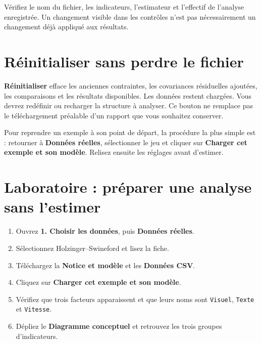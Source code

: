 \documentclass[
  french,
  11pt,
  a4paper,
  DIV=11,
  numbers=noendperiod]{scrreprt}
\providecommand{\tightlist}{%
  \setlength{\itemsep}{0pt}\setlength{\parskip}{0pt}}
\begin{document}
\begin{tcolorbox}[enhanced jigsaw, arc=.35mm, bottomrule=.15mm, bottomtitle=1mm, breakable, colback=white, colbacktitle=quarto-callout-warning-color!10!white, colframe=quarto-callout-warning-color-frame, coltitle=black, left=2mm, leftrule=.75mm, opacityback=0, opacitybacktitle=0.6, rightrule=.15mm, title={Avant de recopier un résultat}, titlerule=0mm, toprule=.15mm, toptitle=1mm]

Vérifiez le nom du fichier, les indicateurs, l'estimateur et l'effectif
de l'analyse enregistrée. Un changement visible dans les contrôles n'est
pas nécessairement un changement déjà appliqué aux résultats.

\end{tcolorbox}

\section{Réinitialiser sans perdre le
fichier}\label{ruxe9initialiser-sans-perdre-le-fichier}

\textbf{Réinitialiser} efface les anciennes contraintes, les covariances
résiduelles ajoutées, les comparaisons et les résultats disponibles. Les
données restent chargées. Vous devrez redéfinir ou recharger la
structure à analyser. Ce bouton ne remplace pas le téléchargement
préalable d'un rapport que vous souhaitez conserver.

Pour reprendre un exemple à son point de départ, la procédure la plus
simple est : retourner à \textbf{Données réelles}, sélectionner le jeu
et cliquer sur \textbf{Charger cet exemple et son modèle}. Relisez
ensuite les réglages avant d'estimer.

\section{Laboratoire : préparer une analyse sans
l'estimer}\label{laboratoire-pruxe9parer-une-analyse-sans-lestimer}

\begin{enumerate}
\def\labelenumi{\arabic{enumi}.}
\tightlist
\item
  Ouvrez \textbf{1. Choisir les données}, puis \textbf{Données réelles}.
\item
  Sélectionnez Holzinger--Swineford et lisez la fiche.
\item
  Téléchargez la \textbf{Notice et modèle} et les \textbf{Données CSV}.
\item
  Cliquez sur \textbf{Charger cet exemple et son modèle}.
\item
  Vérifiez que trois facteurs apparaissent et que leurs noms sont
  \texttt{Visuel}, \texttt{Texte} et \texttt{Vitesse}.
\item
  Dépliez le \textbf{Diagramme conceptuel} et retrouvez les trois
  groupes d'indicateurs.
\end{enumerate}
\end{document}
